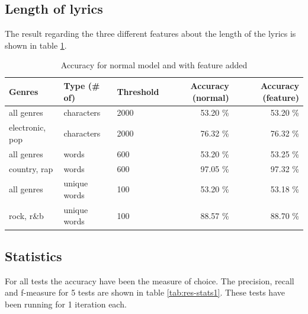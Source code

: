\documentclass[a4paper, 12pt]{article}
\begin{document}
\subsection{Length of lyrics}
The result regarding the three different features about the length of the lyrics is shown in table \ref{tab:res-lengths}.

\begin{table}[h]
\begin{center}
    \begin{tabular}{| l | l | l | r | r |}
        \hline
        Genres & Type (\# of)& Threshold & Accuracy (normal) & Accuracy (feature) \\
        \hline
        all genres      & characters    & 2000 & 53.20 \% & 53.20 \% \\ \hline
        electronic, pop & characters    & 2000 & 76.32 \% & 76.32 \% \\ \hline
        all genres            & words         & 600  & 53.20 \% & 53.25 \% \\ \hline
        country, rap    & words         & 600  & 97.05 \% & 97.32 \% \\ \hline
        all genres          & unique words  & 100  & 53.20 \% & 53.18 \% \\ \hline
        rock, r\&b      & unique words  & 100  & 88.57 \% & 88.70 \% \\ \hline
    \end{tabular}
    \caption{Accuracy for normal model and with feature added}
    \label{tab:res-lengths}
\end{center}
\end{table}

\subsection{Statistics}
For all tests the accuracy have been the measure of choice.
The precision, recall and f-measure for 5 tests are shown in table \ref{tab:res-stats1}.
These tests have been running for 1 iteration each.
\end{document}
